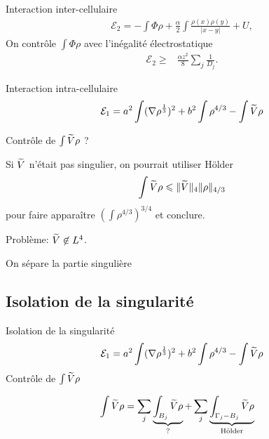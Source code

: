 \documentclass{beamer}
\renewcommand{\leq}{\leqslant}
\renewcommand{\ge}{\geqslant}
\begin{document}
\begin{frame}{Interaction inter-cellulaire}
  \begin{align*}
    {\mathcal{E}_2} = {-\int \Phi \rho +  \frac{\alpha}{2}\int\frac{\rho(x) \rho(y)}{|x-y|}+U,}
  \end{align*}
  On contrôle $\int \Phi \rho$ avec l'inégalité électrostatique
  \begin{align*}
        \mathcal{E}_2 \ge& \frac{\alpha z^2}{8}\sum_j \frac{1}{D_j}.
  \end{align*}

\end{frame}
\begin{frame}{Interaction intra-cellulaire}
  \begin{align*}
    \mathcal E_1 = {a^2\int (\nabla \rho^\frac{1}{3})^2 + b^2 \int \rho^{4/3}
    - \int \widetilde{V} \rho}
\end{align*}

Contrôle de $\int \widetilde{V} \rho$ ?

Si $\widetilde{V}$ n'était pas singulier, on pourrait utiliser H\"older
  \begin{align*}
    \int \vv \rho \leq \Vert\vv\Vert_{4} \Vert\rho\Vert_{4/3}
  \end{align*}
  pour faire apparaître $(\int \rho^{4/3})^{3/4}$ et conclure.

  Problème: $\widetilde{V} \not \in L^{4}$.

  On sépare la partie singulière

\end{frame}

\subsection{Isolation de la singularité}
\begin{frame}{Isolation de la singularité}
  \begin{align*}
    \mathcal E_1 = {a^2\int (\nabla \rho^\frac{1}{3})^2 + b^2 \int \rho^{4/3}
    - \int \widetilde{V} \rho}
\end{align*}
  Contrôle de $\int \widetilde{V} \rho$

  \begin{align*}
    \int \widetilde{V} \rho &= \sum_j \underbrace{\int_{B_j} \widetilde{V}
      \rho}_{\text{?}} + \sum_j \underbrace{\int_{\Gamma_j -
      B_j} \widetilde{V} \rho}_{\text{Hölder}}
\end{align*}
\end{frame}
\end{document}
